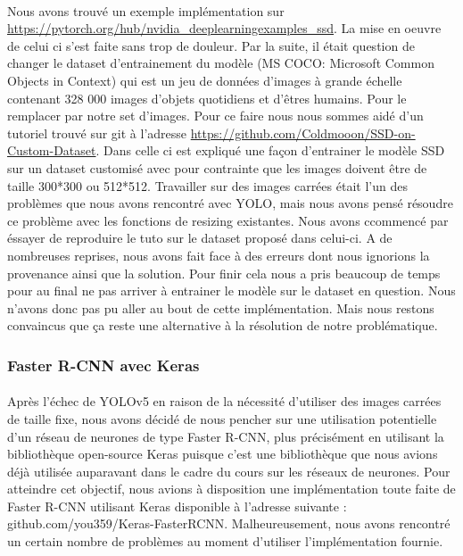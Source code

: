 \paragraph{} Nous avons trouvé un exemple implémentation sur \url{https://pytorch.org/hub/nvidia_deeplearningexamples_ssd}. La mise en oeuvre de celui ci s'est faite sans trop de douleur. Par la suite, il était question de changer le dataset d'entrainement du modèle (MS COCO: Microsoft Common Objects in Context) qui est un jeu de données d'images à grande échelle contenant 328 000 images d'objets quotidiens et d'êtres humains. Pour le remplacer par notre set d'images. Pour ce faire nous nous sommes aidé d'un tutoriel trouvé sur git à l'adresse \url{https://github.com/Coldmooon/SSD-on-Custom-Dataset}. Dans celle ci est expliqué une façon d'entrainer le modèle SSD sur un dataset customisé avec pour contrainte que les images doivent être de taille 300*300 ou 512*512. Travailler sur des images carrées était l'un des problèmes que nous avons rencontré avec YOLO, mais nous avons pensé résoudre ce problème avec les fonctions de resizing existantes. 
Nous avons ccommencé par éssayer de reproduire le tuto sur le dataset proposé dans celui-ci. A de nombreuses reprises, nous avons fait face à des erreurs dont nous ignorions la provenance ainsi que la solution. Pour finir cela nous a pris beaucoup de temps pour au final ne pas arriver à entrainer le modèle sur le dataset en question. Nous n'avons donc pas pu aller au bout de cette implémentation. Mais nous restons convaincus que ça reste une alternative à la résolution de notre problématique.

\subsubsection{Faster R-CNN avec Keras}

\paragraph{} Après l'échec de YOLOv5 en raison de la nécessité d'utiliser des images carrées de taille fixe, nous avons décidé de nous pencher sur une utilisation potentielle d'un réseau de neurones de type Faster R-CNN, plus précisément en utilisant la bibliothèque open-source Keras puisque c'est une bibliothèque que nous avions déjà utilisée auparavant dans le cadre du cours sur les réseaux de neurones. Pour atteindre cet objectif, nous avions à disposition une implémentation toute faite de Faster R-CNN utilisant Keras disponible à l'adresse suivante : github.com/you359/Keras-FasterRCNN. Malheureusement, nous avons rencontré un certain nombre de problèmes au moment d'utiliser l'implémentation fournie.

